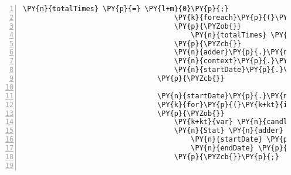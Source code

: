 \begin{Verbatim}[commandchars=\\\{\},numbers=left,firstnumber=1,stepnumber=1,numberblanklines=0]
                                    \PY{n}{totalTimes} \PY{p}{=} \PY{l+m}{0}\PY{p}{;}
                                    \PY{k}{foreach}\PY{p}{(}\PY{n}{TimeSpan} \PY{n}{time} \PY{k}{in} \PY{n}{declineTimes}\PY{p}{)}
                                    \PY{p}{\PYZob{}}
                                        \PY{n}{totalTimes} \PY{p}{+}\PY{p}{=} \PY{n}{t}\PY{p}{.}\PY{n}{TotalMilliseconds}\PY{p}{;}
                                    \PY{p}{\PYZcb{}}
                                    \PY{n}{adder}\PY{p}{.}\PY{n}{avgDeclineTime} \PY{p}{=} \PY{n}{TimeSpan}\PY{p}{.}\PY{n}{FromMilliseconds}\PY{p}{(}\PY{n}{totalTimes} \PY{p}{/} \PY{n}{declineTimes}\PY{p}{.}\PY{n}{Count}\PY{p}{(}\PY{p}{)}\PY{p}{)}\PY{p}{;}
                                    \PY{n}{context}\PY{p}{.}\PY{n}{Stats}\PY{p}{.}\PY{n}{Add}\PY{p}{(}\PY{n}{adder}\PY{p}{)}\PY{p}{;}
                                    \PY{n}{startDate}\PY{p}{.}\PY{n}{AddDays}\PY{p}{(}\PY{l+m}{1}\PY{p}{)}\PY{p}{;}
                                \PY{p}{\PYZcb{}}

                                \PY{n}{startDate}\PY{p}{.}\PY{n}{AddDays}\PY{p}{(}\PY{p}{\PYZhy{}}\PY{n}{days}\PY{p}{)}\PY{p}{;}
                                \PY{k}{for}\PY{p}{(}\PY{k+kt}{int} \PY{n}{i} \PY{p}{=} \PY{l+m}{0}\PY{p}{;} \PY{n}{i} \PY{p}{\PYZlt{}} \PY{n}{days}\PY{p}{;} \PY{n}{i}\PY{p}{+}\PY{p}{+}\PY{p}{)}
                                \PY{p}{\PYZob{}}
                                    \PY{k+kt}{var} \PY{n}{candles} \PY{p}{=} \PY{n}{client}\PY{p}{.}\PY{n}{ProductsService}\PY{p}{.}\PY{n}{GetHistoricRatesAsync}\PY{p}{(}\PY{n}{p}\PY{p}{.}\PY{n}{Id}\PY{p}{,} \PY{n}{startDate}\PY{p}{,} \PY{n}{endDate}\PY{p}{,} \PY{n}{CandleGranularity}\PY{p}{.}\PY{n}{Minutes1}\PY{p}{)}\PY{p}{.}\PY{n}{Result}\PY{p}{;}
                                    \PY{n}{Stat} \PY{n}{adder} \PY{p}{=} \PY{k}{new} \PY{n}{Stat}\PY{p}{(}\PY{p}{)}\PY{p}{\PYZob{}}
                                        \PY{n}{startDate} \PY{p}{=} \PY{n}{candles}\PY{p}{.}\PY{n}{First}\PY{p}{(}\PY{p}{)}\PY{p}{.}\PY{n}{Time}\PY{p}{,}
                                        \PY{n}{endDate} \PY{p}{=} \PY{n}{candles}\PY{p}{.}\PY{n}{Last}\PY{p}{(}\PY{p}{)}\PY{p}{.}\PY{n}{Time}  
                                    \PY{p}{\PYZcb{}}\PY{p}{;}


\end{Verbatim}
